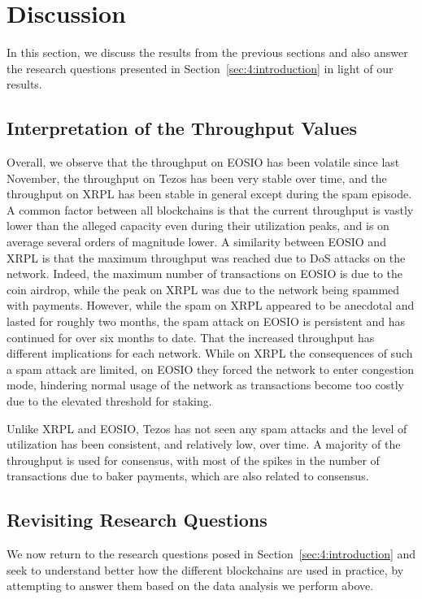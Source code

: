 \section{Discussion}
\label{sec:4:discussion}
In this section, we discuss the results from the previous sections and also answer the research questions presented in Section~\ref{sec:4:introduction} in light of our results.


\subsection{Interpretation of the Throughput Values}
Overall, we observe that the throughput on EOSIO has been volatile since last November, the throughput on Tezos has been very stable over time, and the throughput on XRPL has been stable in general except during the spam episode.
A common factor between all blockchains is that the current throughput is vastly lower than the alleged capacity even during their utilization peaks, and is on average several orders of magnitude lower.
A similarity between EOSIO and XRPL is that the maximum throughput was reached due to DoS attacks on the network. Indeed, the maximum number of transactions on EOSIO is due to the  coin airdrop, while the peak on XRPL was due to the network being spammed with payments.
However, while the spam on XRPL appeared to be anecdotal and lasted for roughly two months, the spam attack on EOSIO is persistent and has continued for over six months to date.
That the increased throughput has different implications for each network.
While on XRPL the consequences of such a spam attack are limited, on EOSIO they forced the network to enter congestion mode, hindering normal usage of the network as transactions become too costly due to the elevated threshold for staking.

Unlike XRPL and EOSIO, Tezos has not seen any spam attacks and the level of utilization has been consistent, and relatively low, over time. A majority of the throughput is used for consensus, with most of the spikes in the number of transactions due to baker payments, which are also related to consensus.

\subsection{Revisiting Research Questions}
We now return to the research questions posed in Section~\ref{sec:4:introduction} and seek to understand better how the different blockchains are used in practice, by attempting to answer them based on the data analysis we perform above.

